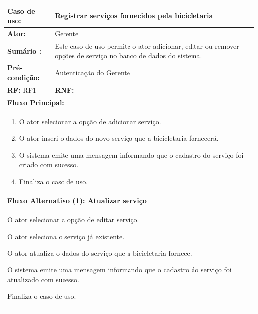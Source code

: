 \documentclass[
	12pt,				%
	openright,
	oneside,			%
	a4paper,			%
	chapter=TITLE,		%
	brazil				%
	]{abntex2}
\begin{document}
\begin{table}[h]
\centering
\begin{tabular}{|p{3cm}|p{3cm}|p{3cm}|p{3cm}|}
\hline
\textbf{Caso de uso:}             & \multicolumn{3}{p{9cm}|}{Registrar serviços fornecidos pela bicicletaria}				 \\ \hline
\textbf{Ator:}                 & \multicolumn{3}{p{9cm}|}{Gerente}         			          						 	\\ \hline
\textbf{Sumário :}                & \multicolumn{3}{p{9cm}|}{Este caso de uso permite o ator adicionar, editar ou remover opções de %
													serviço no banco de dados do sistema.}         	\\ \hline
\textbf{Pré-condição:}            & \multicolumn{3}{p{9cm}|}{ Autenticação do Gerente }                                   				    \\ \hline
\multicolumn{2}{|p{6cm}|}{\textbf{RF:} RF1 }                  & \multicolumn{2}{p{6cm}|}{\textbf{RNF:} --}     	    \\ \hline
\multicolumn{4}{|p{12cm}|}{\textbf{Fluxo Principal:}}                                                					\\ \hline
\multicolumn{4}{|p{12cm}|}{%
\begin{enumerate}
  \item O ator selecionar a opção de adicionar serviço.
  \item O ator inseri o dados do novo serviço que a bicicletaria fornecerá.
  \item O sistema emite uma mensagem informando que o cadastro do serviço foi criado com sucesso.
  \item Finaliza o caso de uso.
\end{enumerate}}                                                               				 							\\ \hline

\multicolumn{4}{|p{12cm}|}{\textbf{Fluxo Alternativo (1): Atualizar serviço}}                              					\\ \hline
\multicolumn{4}{|p{12cm}|}{%
\begin{alineas}
	\item O ator selecionar a opção de editar serviço.
  	\item O ator seleciona o serviço já existente.
	\item O ator atualiza o dados do serviço que a bicicletaria fornece.
	\item O sistema emite uma mensagem informando que o cadastro do serviço foi atualizado com sucesso.
	\item Finaliza o caso de uso.
\end{alineas}}                                                               				 							\\ \hline


\end{tabular}
\end{table}
\end{document}

